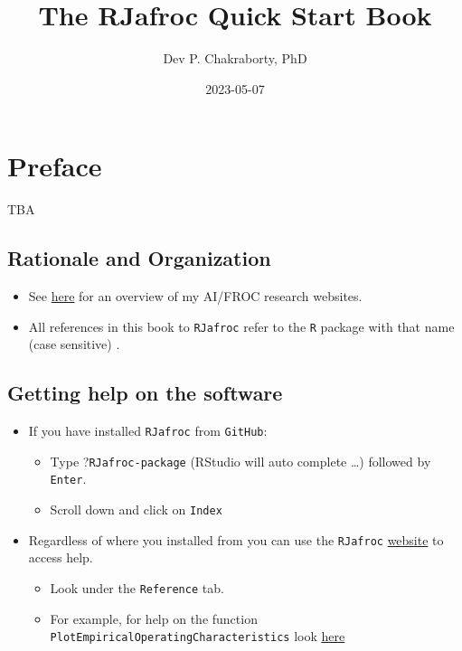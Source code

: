 \documentclass[
]{book}
\title{The RJafroc Quick Start Book}
\author{Dev P. Chakraborty, PhD}
\date{2023-05-07}
\providecommand{\tightlist}{%
  \setlength{\itemsep}{0pt}\setlength{\parskip}{0pt}}
\begin{document}
\maketitle

{
\setcounter{tocdepth}{1}
\tableofcontents
}
\hypertarget{quick-start-index-preface}{%
\chapter{Preface}\label{quick-start-index-preface}}

TBA

\hypertarget{quick-start-index-rationale-and-organization}{%
\section{Rationale and Organization}\label{quick-start-index-rationale-and-organization}}

\begin{itemize}
\tightlist
\item
  See \href{https://dpc10ster.github.io/ai-froc-research/}{here} for an overview of my AI/FROC research websites.
\item
  All references in this book to \texttt{RJafroc} refer to the \texttt{R} package with that name (case sensitive) \citep{R-RJafroc}.
\end{itemize}

\hypertarget{quick-start-index-getting-help}{%
\section{Getting help on the software}\label{quick-start-index-getting-help}}

\begin{itemize}
\tightlist
\item
  If you have installed \texttt{RJafroc} from \texttt{GitHub}:

  \begin{itemize}
  \tightlist
  \item
    Type ?\texttt{RJafroc-package} (RStudio will auto complete \ldots) followed by \texttt{Enter}.
  \item
    Scroll down and click on \texttt{Index}
  \end{itemize}
\item
  Regardless of where you installed from you can use the \texttt{RJafroc} \href{https://dpc10ster.github.io/RJafroc/}{website} to access help.

  \begin{itemize}
  \tightlist
  \item
    Look under the \texttt{Reference} tab.
  \item
    For example, for help on the function \texttt{PlotEmpiricalOperatingCharacteristics} look \href{https://dpc10ster.github.io/RJafroc/reference/PlotEmpiricalOperatingCharacteristics.html}{here}
  \end{itemize}
\end{itemize}
\end{document}
